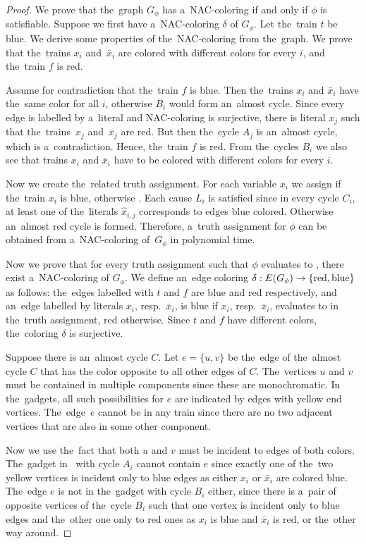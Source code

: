 \begin{proof}
	We prove that the~graph $G_\phi$ has a~NAC-coloring if and only if
	$\phi$ is satisfiable.
	Suppose we first have a~NAC-coloring $\delta$ of $G_\phi$.
	Let the~train $t$ be blue.
	We derive some properties of the~NAC-coloring from the~graph.
	We prove that the~trains $x_i$ and~$\bar{x}_i$
	are colored with different colors for every $i$,
	and the~train $f$ is red.

	Assume for contradiction that the~train $f$ is blue.
	Then the~trains $x_i$ and $\bar{x}_i$ have the~same color for all $i$,
	otherwise $B_i$ would form an~almost cycle.
	Since every edge is labelled by a~literal and NAC-coloring is surjective,
	there is literal $x_j$ such that the~trains~$x_j$ and~$\bar{x}_j$ are red.
	But then the~cycle $A_j$ is an~almost cycle, which is a~contradiction.
	Hence, the~train $f$ is red.
	From the~cycles $B_i$ we also see
	that trains $x_i$ and $\bar{x}_i$ have to be colored with different colors
	for every $i$.

	Now we create the~related truth assignment.
	For each variable $x_i$ we assign \true{} if
	the~train $x_i$ is blue,
	otherwise \false{}.
	Each cause $L_i$ is satisfied since
	in every cycle $C_i$, at least one of
	the~literals $\hat{x}_{i,j}$ corresponds to edges blue colored.
	Otherwise an~almost red cycle is formed.
	Therefore, a~truth assignment for $\phi$ can be obtained
	from a~NAC-coloring of~$G_\phi$ in polynomial time.

	Now we prove that for every truth assignment such that $\phi$ evaluates to \true{}, there exist
	a~NAC-coloring of $G_\phi$. We define an~edge coloring
	$\delta: E(G_\phi) \to \{\text{red}, \text{blue}\}$ as follows:
	the~edges labelled with $t$ and $f$ are blue and red respectively,
	and an~edge labelled by literals $x_i$, resp.\ $\bar{x}_i$, is blue
	if $x_i$, resp.\ $\bar{x}_i$, evaluates to \true{} in the~truth assignment, red otherwise.
	Since $t$ and $f$ have different colors,
	the~coloring $\delta$ is surjective.

	Suppose there is an~almost cycle $C$.
	Let $e=\{u, v\}$ be the~edge of the~almost cycle $C$ that has the color opposite
	to all other edges of $C$.
	The~vertices $u$ and $v$ must be contained in multiple \trcon{} components
	since these are monochromatic.
	In the~gadgets, all such possibilities for $e$ are indicated by edges with yellow end vertices.
	The~edge~$e$ cannot be in any train since there are no two adjacent vertices that are also
	in some other \trcon{} component.

	Now we use the~fact that both $u$ and $v$ must be incident to edges of both colors.
	The~gadget in~ with cycle $A_i$
	cannot contain $e$ since exactly one of the~two yellow vertices is incident only to blue edges
	as either $x_i$ or $\bar{x}_i$ are colored blue.
	The~edge $e$ is not in the~gadget with cycle $B_i$ either,
	since there is a~pair of opposite vertices of the~cycle $B_i$
	such that one vertex is incident only to blue edges and the~other one only to red ones
	as $x_i$ is blue and $\bar{x}_i$ is red, or the~other way around.


\end{proof}
